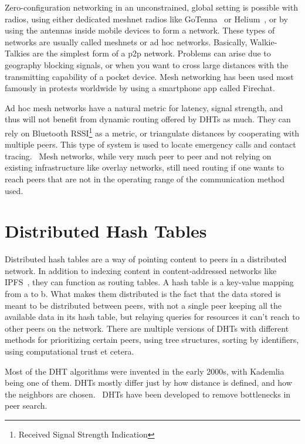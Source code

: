 Zero-configuration networking in an unconstrained, global setting is possible with radios, using either dedicated meshnet radios like GoTenna~\cite{GoTenna} or Helium~\cite{Helium}, or by using the antennas inside mobile devices to form a network. These types of networks are usually called meshnets or ad hoc networks. Basically, Walkie-Talkies are the simplest form of a p2p network. Problems can arise due to geography blocking signals, or when you want to cross large distances with the transmitting capability of a pocket device. Mesh networking has been used most famously in protests worldwide by using a smartphone app called Firechat.~\cite{Milian2014-mt}

Ad hoc mesh networks have a natural metric for latency, signal strength, and thus will not benefit from dynamic routing offered by DHTs as much. They can rely on Bluetooth RSSI\footnote{Received Signal Strength Indication} as a metric, or triangulate distances by cooperating with multiple peers. This type of system is used to locate emergency calls and contact tracing.~\cite{theintercept} Mesh networks, while very much peer to peer and not relying on existing infrastructure like overlay networks, still need routing if one wants to reach peers that are not in the operating range of the communication method used. 

\section{Distributed Hash Tables}
Distributed hash tables are a way of pointing content to peers in a distributed network. In addition to indexing content in content-addressed networks like IPFS~\cite{IPFS}, they can function as routing tables. A hash table is a key-value mapping from a to b. What makes them distributed is the fact that the data stored is meant to be distributed between peers, with not a single peer keeping all the available data in its hash table, but relaying queries for resources it can't reach to other peers on the network. There are multiple versions of DHTs with different methods for prioritizing certain peers, using tree structures, sorting by identifiers, using computational trust et cetera.

Most of the DHT algorithms were invented in the early 2000s, with Kademlia being one of them. DHTs mostly differ just by how distance is defined, and how the neighbors are chosen.~\cite{Cai2015-ra} DHTs have been developed to remove bottlenecks in peer search.
						

